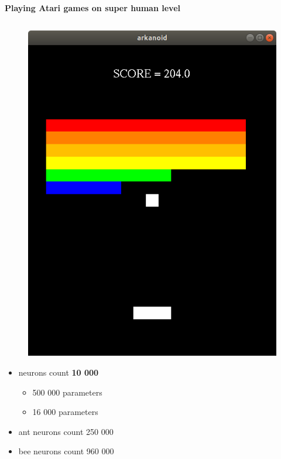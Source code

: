 \documentclass[xcolor=dvipsnames]{beamer}
\begin{document}
\begin{frame}{\bf Playing Atari games on super human level}
\begin{columns}
\begin{column}{0.5\textwidth}
        \begin{figure}
          \includegraphics[scale=0.2]{../../pictures/arkanoid.png}
        \end{figure}

        \begin{itemize}
            \item neurons count {\bf 10 000}
            {\footnotesize
                \begin{itemize}
                    \item 500 000 parameters
                    \item 16  000 parameters
                \end{itemize}
            }
            \item ant neurons count 250 000
            \item bee neurons count 960 000
        \end{itemize}

    \end{column}


\end{columns}




\end{frame}
\end{document}
